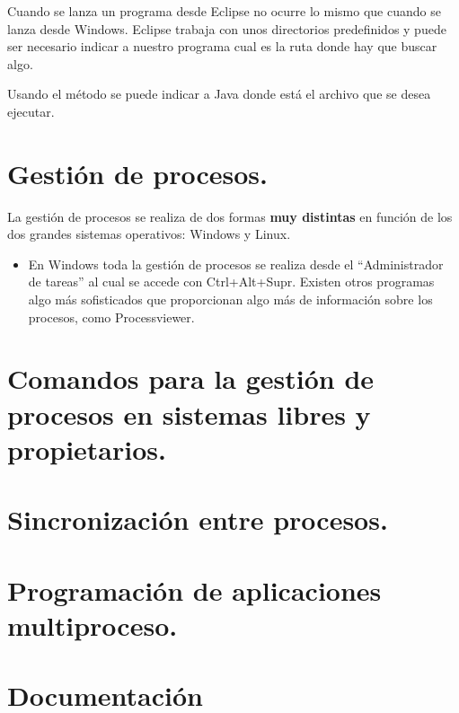 \documentclass[a4paper,12pt,spanish]{sphinxmanual}
\begin{document}
Cuando se lanza un programa desde Eclipse no ocurre lo mismo que cuando se lanza desde Windows. Eclipse trabaja con unos directorios predefinidos y puede ser necesario indicar a nuestro programa cual es la ruta donde hay que buscar algo.

Usando el método  se puede indicar a Java donde está el archivo que se desea ejecutar.


\section{Gestión de procesos.}
\label{textos/tema1:gestion-de-procesos}
La gestión de procesos se realiza de dos formas \textbf{muy distintas} en función de los dos grandes sistemas operativos: Windows y Linux.
\begin{itemize}
\item {} 
En Windows toda la gestión de procesos se realiza desde el ``Administrador de tareas'' al cual se accede con Ctrl+Alt+Supr. Existen otros programas algo más sofisticados que proporcionan algo más de información sobre los procesos, como Processviewer.

\end{itemize}


\section{Comandos para la gestión de procesos en sistemas libres y propietarios.}
\label{textos/tema1:comandos-para-la-gestion-de-procesos-en-sistemas-libres-y-propietarios}

\section{Sincronización entre procesos.}
\label{textos/tema1:sincronizacion-entre-procesos}

\section{Programación de aplicaciones multiproceso.}
\label{textos/tema1:programacion-de-aplicaciones-multiproceso}

\section{Documentación}
\label{textos/tema1:documentacion}
\end{document}
